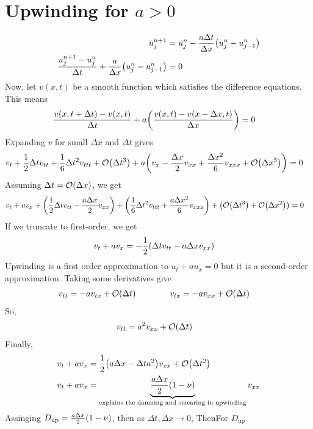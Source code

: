 \documentclass{article}
\newcommand{\Dx}{\Delta x}
\newcommand{\Dt}{\Delta t}
\newcommand{\centdiff}{\frac{u_j^{n+1} - u_j^n}{\Dt}}
\begin{document}
    \section{Upwinding for $a > 0$}
        \begin{align*}
            u_j^{n+1} &= u_j^n - \frac{a\Dt}{\Dx}\qty(u_j^n - u_{j-1}^n) \\
            \centdiff + \frac{a}{\Dx}\qty(u_j^n - u_{j-1}^n) &= 0
        \end{align*}
        Now, let $v(x,t)$ be a smooth function which satisfies the difference equations.  This means
        \begin{align*}
            \frac{v(x,t+\Dt) - v(x,t)}{\Dt} + a\qty(\frac{v(x,t) - v(x - \Dx,t)}{\Dx}) &= 0
        \end{align*}
        Expanding $v$ for small $\Dx$ and $\Dt$ gives
        \begin{align}
            v_t + \frac{1}{2}\Dt v_{tt} + \frac{1}{6}\Dt^2v_{ttt} + \order{\Dt^3} + a\qty(v_x - \frac{\Dx}{2}v_{xx} + \frac{\Dx^2}{6}v_{xxx} + \order{\Dx^3}) &= 0
        \end{align}
        Assuming $\Dt = \order{\Dx}$, we get
        \begin{align}
            v_t + a v_x + \qty(\frac{1}{2}\Dt v_{tt} - \frac{a\Dx}{2}v_{xx}) + \qty(\frac{1}{6}\Dt^2v_{ttt} + \frac{a\Dx^2}{6}v_{xxx}) + \qty(\order{\Dt^3} + \order{\Dx^2}) &= 0
        \end{align}
        If we truncate to first-order, we get
        \begin{align}
            v_t + av_x &= -\frac{1}{2}\qty(\Dt v_{tt} - a\Dx v_{xx})
        \end{align}
        Upwinding is a first order approximation to $u_t + au_x = 0$ but it is a second-order approximation.  Taking some derivatives give
        \begin{align}
            v_{tt} &= -av_{tx} +\order{\Dt} \qquad \qquad v_{tx} = -av_{xx} + \order{\Dt}
        \end{align}
        So,
        \begin{align}
            v_{tt} &= a^2v_{xx} + \order{\Dt}
        \end{align}
        Finally,
        \begin{align}
            v_t + av_x &= \frac{1}{2}\qty(a\Dx - \Dt a^2)v_{xx} + \order{\Dt^2} \\
            v_t + av_x &= \underbrace{\frac{a\Dx}{2}\qty(1 - \nu)}_{\text{explains the damning and smearing in upwinding}}v_{xx}
        \end{align}
        {\color{red} Assinging $D_{\text{up}} = \frac{a\Dx}{2}\qty(1 - \nu)$, then as $\Dt, \Dx \rightarrow 0$, ThenFor $D_{\text{up}}$}
\end{document}
